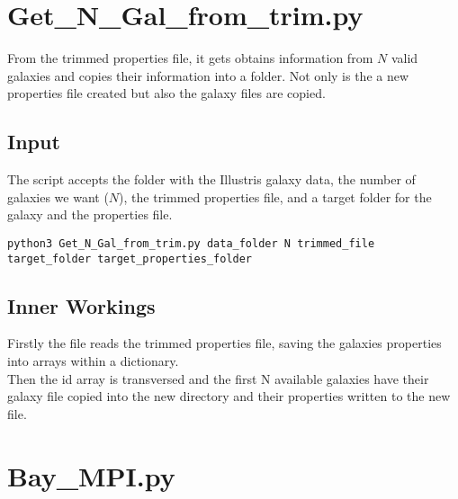 \documentclass[11pt]{article}
\begin{document}
\newpage



\section{Get\_N\_Gal\_from\_trim.py}

From the trimmed properties file, it gets obtains information from $N$ valid galaxies and copies their information into a folder. Not only is the a new properties file created but also the galaxy files are copied.

\subsection{Input}

The script accepts the folder with the Illustris galaxy data, the number of galaxies we want ($N$), the trimmed properties file, and a target folder for the galaxy and the properties file.

\begin{verbatim}
python3 Get_N_Gal_from_trim.py data_folder N trimmed_file target_folder target_properties_folder
\end{verbatim}

\subsection{Inner Workings}

Firstly the file reads the trimmed properties file, saving the galaxies properties into arrays within a dictionary.\\

Then the id array is transversed and the first N available galaxies have their galaxy file copied into the new directory and their properties written to the new file.


\newpage



\section{Bay\_MPI.py}
\end{document}
